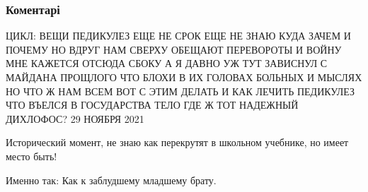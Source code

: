  
 
 
 
 
\subsubsection{Коментарі}

\begin{itemize} %

\obeycr
ЦИКЛ: ВЕЩИ
ПЕДИКУЛЕЗ
ЕЩЕ НЕ СРОК ЕЩЕ НЕ ЗНАЮ
КУДА ЗАЧЕМ И ПОЧЕМУ
НО ВДРУГ НАМ СВЕРХУ ОБЕЩАЮТ
ПЕРЕВОРОТЫ И ВОЙНУ
МНЕ КАЖЕТСЯ ОТСЮДА СБОКУ
А Я ДАВНО УЖ ТУТ ЗАВИСНУЛ
С МАЙДАНА ПРОЩЛОГО ЧТО БЛОХИ
В ИХ ГОЛОВАХ БОЛЬНЫХ И МЫСЛЯХ
НО ЧТО Ж НАМ ВСЕМ ВОТ С ЭТИМ ДЕЛАТЬ
И КАК ЛЕЧИТЬ ПЕДИКУЛЕЗ
ЧТО ВЪЕЛСЯ В ГОСУДАРСТВА ТЕЛО
ГДЕ Ж ТОТ НАДЕЖНЫЙ ДИХЛОФОС?
29 НОЯБРЯ 2021
\restorecr

Исторический момент, не знаю как перекрутят в школьном учебнике, но имеет место быть!

Именно так:
Как к заблудшему младшему брату.
\end{itemize} %

